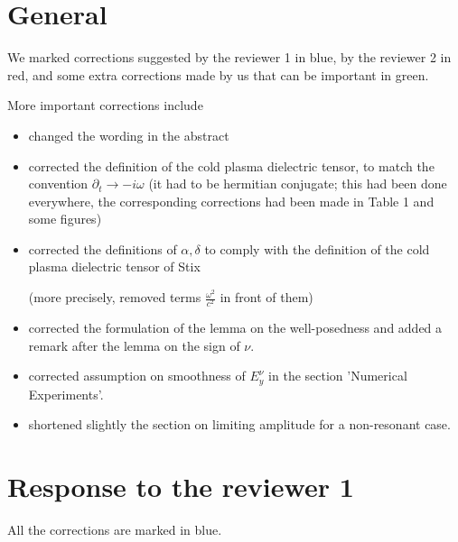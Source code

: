 \documentclass[a4paper,10pt]{article}
\title{}
\author{}
\begin{document}
\maketitle

\begin{abstract}

\end{abstract}

\section{General}

We marked corrections suggested by the reviewer 1 in blue, by the reviewer 2 in red, 
and some extra corrections made by us that can be important in green.

More important corrections include
\begin{itemize}
\item changed the wording in the abstract

\item corrected the definition of the cold plasma dielectric tensor, to match the convention $\partial_t\rightarrow -i\omega$ (it had to be hermitian conjugate; 
this had been done everywhere, the corresponding corrections had been made in Table 1 and some figures)

\item corrected the definitions of $\alpha,\delta$ to comply with the definition of the cold plasma dielectric tensor of Stix 

(more precisely, removed terms $\frac{\omega^2}{c^2}$ in 
front of them)

\item corrected the formulation of the lemma on the well-posedness and added a remark after the lemma on the sign of $\nu$.

\item corrected assumption on smoothness of $E_y^{\nu}$ in the section 'Numerical Experiments'.

\item shortened slightly the section on limiting amplitude for a non-resonant case.
\end{itemize}


\section{Response to the reviewer 1}

All the corrections are marked in blue. 
\end{document}
